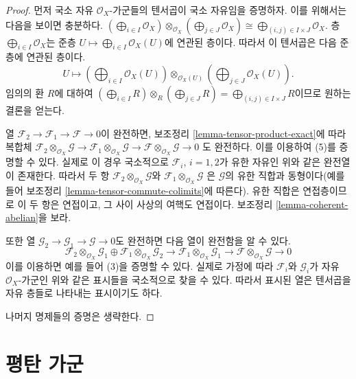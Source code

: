 \begin{proof}
먼저 국소 자유 $\mathcal{O}_X$-가군들의 텐서곱이 국소 자유임을 증명하자.
이를 위해서는 다음을 보이면 충분하다.
$(\bigoplus_{i \in I} \mathcal{O}_X) \otimes_{\mathcal{O}_X}
(\bigoplus_{j \in J} \mathcal{O}_X) \cong
\bigoplus_{(i, j) \in I \times J} \mathcal{O}_X$.
층 $\bigoplus_{i \in I} \mathcal{O}_X$는 준층
$U \mapsto \bigoplus_{i \in I} \mathcal{O}_X(U)$에 연관된 층이다.
따라서 이 텐서곱은 다음 준층에 연관된 층이다.
$$
U \longmapsto
(\bigoplus\nolimits_{i \in I} \mathcal{O}_X(U))
\otimes_{\mathcal{O}_X(U)}
(\bigoplus\nolimits_{j \in J} \mathcal{O}_X(U)).
$$
임의의 환 $R$에 대하여
$(\bigoplus_{i \in I} R) \otimes_R (\bigoplus_{j \in J} R) =
\bigoplus_{(i, j) \in I \times J} R$이므로 원하는 결론을 얻는다.

\medskip\noindent
열 $\mathcal{F}_2 \to \mathcal{F}_1 \to \mathcal{F} \to 0$이 완전하면,
보조정리 \ref{lemma-tensor-product-exact}에 따라 복합체
$\mathcal{F}_2 \otimes_{\mathcal{O}_X} \mathcal{G} \to
\mathcal{F}_1 \otimes_{\mathcal{O}_X} \mathcal{G} \to
\mathcal{F} \otimes_{\mathcal{O}_X} \mathcal{G} \to 0$
도 완전하다. 이를 이용하여 (5)를 증명할 수 있다. 실제로 이 경우 국소적으로
$\mathcal{F}_i$, $i = 1, 2$가 유한 자유인 위와 같은 완전열이 존재한다.
따라서 두 항
$\mathcal{F}_2 \otimes_{\mathcal{O}_X} \mathcal{G}$와
$\mathcal{F}_1 \otimes_{\mathcal{O}_X} \mathcal{G}$
은 $\mathcal{G}$의 유한 직합과 동형이다(예를 들어 보조정리
\ref{lemma-tensor-commute-colimits}에 따른다). 유한 직합은 연접층이므로
이 두 항은 연접이고, 그 사이 사상의 여핵도 연접이다. 보조정리
\ref{lemma-coherent-abelian}을 보라.

\medskip\noindent
또한 열 $\mathcal{G}_2 \to \mathcal{G}_1 \to \mathcal{G} \to 0$도
완전하면 다음 열이 완전함을 알 수 있다.
$$
\mathcal{F}_2 \otimes_{\mathcal{O}_X} \mathcal{G}_1
\oplus
\mathcal{F}_1 \otimes_{\mathcal{O}_X} \mathcal{G}_2
\to
\mathcal{F}_1 \otimes_{\mathcal{O}_X} \mathcal{G}_1
\to
\mathcal{F} \otimes_{\mathcal{O}_X} \mathcal{G}
\to 0
$$
이를 이용하면 예를 들어 (3)을 증명할 수 있다. 실제로 가정에 따라
$\mathcal{F}_i$와 $\mathcal{G}_i$가 자유 $\mathcal{O}_X$-가군인
위와 같은 표시들을 국소적으로 찾을 수 있다. 따라서 표시된 열은
텐서곱을 자유 층들로 나타내는 표시이기도 하다.

\medskip\noindent
나머지 명제들의 증명은 생략한다.
\end{proof}





\section{평탄 가군}
\label{section-flat}

